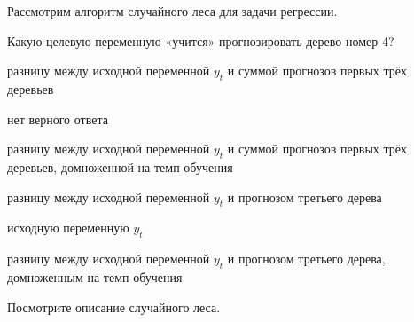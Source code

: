 
\begin{question}
Рассмотрим алгоритм случайного леса для задачи регрессии.

Какую целевую переменную «учится» прогнозировать дерево номер 4?
\begin{answerlist}
  \item разницу между исходной переменной \(y_t\) и суммой прогнозов первых трёх деревьев
  \item нет верного ответа
  \item разницу между исходной переменной \(y_t\) и суммой прогнозов первых трёх деревьев, домноженной на темп обучения
  \item разницу между исходной переменной \(y_t\) и прогнозом третьего дерева
  \item исходную переменную \(y_t\)
  \item разницу между исходной переменной \(y_t\) и прогнозом третьего дерева, домноженным на темп обучения
\end{answerlist}
\end{question}

\begin{solution}
Посмотрите описание случайного леса.
\end{solution}

